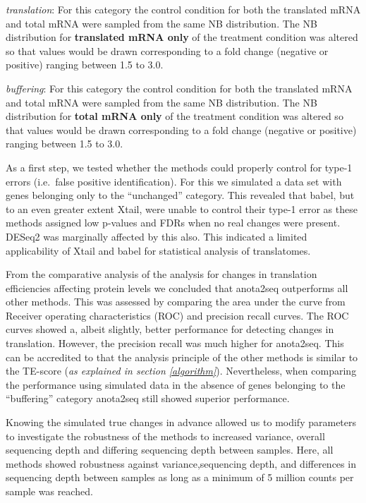 \documentclass[12pt,openany]{book}
\begin{document}
\emph{translation}: For this category the control condition for both the
translated mRNA and total mRNA were sampled from the same NB
distribution. The NB distribution for \textbf{translated mRNA only} of
the treatment condition was altered so that values would be drawn
corresponding to a fold change (negative or positive) ranging between
1.5 to 3.0.

\emph{buffering}: For this category the control condition for both the
translated mRNA and total mRNA were sampled from the same NB
distribution. The NB distribution for \textbf{total mRNA only} of the
treatment condition was altered so that values would be drawn
corresponding to a fold change (negative or positive) ranging between
1.5 to 3.0.

As a first step, we tested whether the methods could properly control
for type-1 errors (i.e.~false positive identification). For this we
simulated a data set with genes belonging only to the ``unchanged''
category. This revealed that babel, but to an even greater extent Xtail,
were unable to control their type-1 error as these methods assigned low
p-values and FDRs when no real changes were present. DESeq2 was
marginally affected by this also. This indicated a limited applicability
of Xtail and babel for statistical analysis of translatomes.

From the comparative analysis of the analysis for changes in translation
efficiencies affecting protein levels we concluded that anota2seq
outperforms all other methods. This was assessed by comparing the area
under the curve from Receiver operating characteristics (ROC) and
precision recall curves. The ROC curves showed a, albeit slightly,
better performance for detecting changes in translation. However, the
precision recall was much higher for anota2seq. This can be accredited
to that the analysis principle of the other methods is similar to the
TE-score (\emph{as explained in section \ref{algorithm}}). Nevertheless,
when comparing the performance using simulated data in the absence of
genes belonging to the ``buffering'' category anota2seq still showed
superior performance.

Knowing the simulated true changes in advance allowed us to modify
parameters to investigate the robustness of the methods to increased
variance, overall sequencing depth and differing sequencing depth
between samples. Here, all methods showed robustness against
variance,sequencing depth, and differences in sequencing depth between
samples as long as a minimum of 5 million counts per sample was reached.
\end{document}
